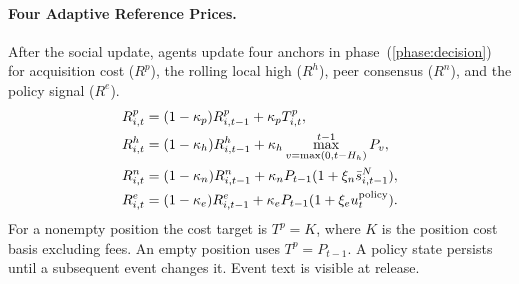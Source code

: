 \paragraph{Four Adaptive Reference Prices.} After the social update, agents update four anchors in phase~(\ref{phase:decision}) for acquisition cost ($R^p$), the rolling local high ($R^h$), peer consensus ($R^n$), and the policy signal ($R^e$).
\begin{align}
 R^p_{i,t}&=(1-\kappa_p)R^p_{i,t-1}+\kappa_p T^p_{i,t},\label{eq:ref_p}\\
 R^h_{i,t}&=(1-\kappa_h)R^h_{i,t-1}+\kappa_h \max_{v=\max(0,t-H_h)}^{t-1}P_v,\label{eq:ref_h}\\
 R^n_{i,t}&=(1-\kappa_n)R^n_{i,t-1}+\kappa_nP_{t-1}(1+\xi_n\bar s^N_{i,t-1}),\label{eq:ref_n}\\
 R^e_{i,t}&=(1-\kappa_e)R^e_{i,t-1}+\kappa_eP_{t-1}(1+\xi_e u_t^{\rm policy}).\label{eq:ref_e}
\end{align}
For a nonempty position the cost target is $T^p=K$, where $K$ is the position cost basis excluding fees. An empty position uses $T^p=P_{t-1}$. A policy state persists until a subsequent event changes it. Event text is visible at release.

